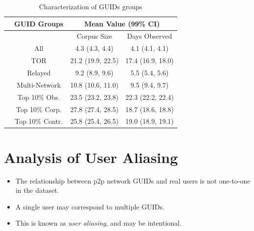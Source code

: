 \documentclass[notes]{beamer}
\begin{document}
\begin{frame}

\begin{block}

\begin{table} 

\centering

\caption{Characterization of GUIDs groups} 
\label{tab:table5}
\begin{tabular}{c|ccc}\hline & \multicolumn{1}{c}{GUID Groups} & \multicolumn{2}{c}{Mean Value (99\% CI)} \\

\hline 
& & Corpus Size & Days Observed \\ 

\hline
\hline
\parbox[t]{2mm}{} & All & 4.3 (4.3, 4.4) & 4.1 (4.1, 4.1) \\
& TOR & 21.2 (19.9, 22.5) & 17.4 (16.9, 18.0)\\
& Relayed & 9.2 (8.9, 9.6) & 5.5 (5.4, 5.6)\\
& Multi-Network & 10.8 (10.6, 11.0) & 9.5 (9.4, 9.7)\\
& Top 10\% Obs. & 23.5 (23.2, 23.8) & 22.3 (22.2, 22.4)\\
& Top 10\% Corp. & 27.8 (27.4, 28.5) & 18.7 (18.6, 18.8)\\
& Top 10\% Contr. & 25.8 (25.4, 26.5) & 19.0 (18.9, 19.1)\\
\hline

\end{tabular}

\end{table}

\end{block}

\end{frame}

\section{Analysis of User Aliasing}
\begin{frame}

\begin{itemize}

\item[\checkmark]The relationship between p2p network GUIDs and real users is not one-to-one in the dataset.

\item[\checkmark]A single user may correspond to multiple GUIDs.


\item[\checkmark]This is known as \textit{user aliasing}, and may be intentional.

\end{itemize}

\end{frame}
\end{document}
